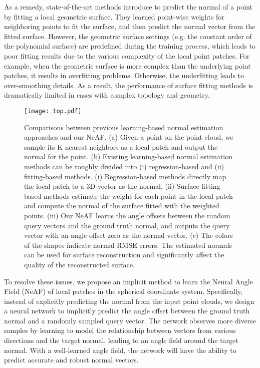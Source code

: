 \documentclass[letterpaper]{article} \usepackage{aaai23}  \usepackage{times}  \usepackage{helvet}  \usepackage{courier}  \usepackage[hyphens]{url}  \usepackage{graphicx} \urlstyle{rm} \def\UrlFont{\rm}  \usepackage{natbib}  \usepackage{caption} \frenchspacing  \setlength{\pdfpagewidth}{8.5in} \setlength{\pdfpageheight}{11in} \usepackage{algorithm}
\begin{document}
As a remedy, state-of-the-art methods introduce to predict the normal of a point by fitting a local geometric surface. They learned point-wise weights for neighboring points to fit the surface, and then predict the normal vector from the fitted surface. However, the geometric surface settings (e.g. the constant order of the polynomial surface) are predefined during the training process, which leads to poor fitting results due to the various complexity of the local point patches.
For example, when the geometric surface is more complex than the underlying point patches, it results in overfitting problems. Otherwise, the underfitting leads to over-smoothing details. As a result, the performance of surface fitting methods is dramatically limited in cases with complex topology and geometry.

\begin{figure*}[t]
\centering
\texttt{[image: top.pdf]}
\caption{Comparisons between previous learning-based normal estimation approaches and our NeAF. (a) Given a point on the point cloud, we sample its K nearest neighbors as a local patch and output the normal for the point. (b) Existing learning-based normal estimation methods can be roughly divided into (i) regression-based and (ii) fitting-based methods. (i) Regression-based methods directly map the local patch to a 3D vector as the normal. (ii) Surface fitting-based methods estimate the weight for each point in the local patch and compute the normal of the surface fitted with the weighted points. (iii) Our NeAF learns the angle offsets between the random query vectors and the ground truth normal, and outputs the query vector with an angle offset zero as the normal vector. (c) The colors of the shapes indicate normal RMSE errors. The estimated normals can be used for surface reconstruction and significantly affect the quality of the reconstructed surface.}
\label{fig:methods_cpmparison}
\end{figure*}

To resolve these issues, we propose an implicit method to learn the Neural Angle Field (NeAF) of local patches in the spherical coordinate system. Specifically, instead of explicitly predicting the normal from the input point clouds, we design a neural network to implicitly predict the angle offset between the ground truth normal and a randomly sampled query vector. The network observes more diverse samples by learning to model the relationship between vectors from various directions and the target normal, leading to an angle field around the target normal.
With a well-learned angle field, the network will have the ability to predict accurate and robust normal vectors. 
\end{document}
